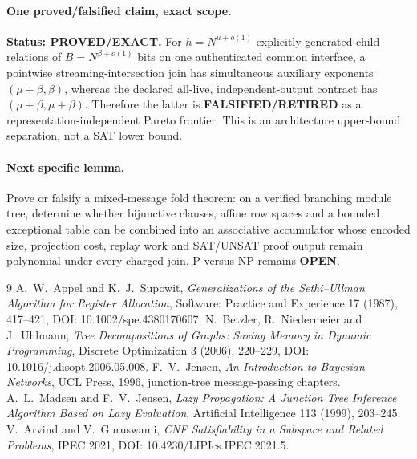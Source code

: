 \documentclass[11pt]{article}
\newcommand{\Status}[1]{\textbf{Status: #1.}}
\begin{document}
\paragraph{One proved/falsified claim, exact scope.}
\Status{PROVED/EXACT} For $h=N^{\mu+o(1)}$ explicitly generated child relations of
$B=N^{\beta+o(1)}$ bits on one authenticated common interface, a pointwise streaming-intersection
join has simultaneous auxiliary exponents $(\mu+\beta,\beta)$, whereas the declared all-live,
independent-output contract has $(\mu+\beta,\mu+\beta)$.  Therefore the latter is
\textbf{FALSIFIED/RETIRED} as a representation-independent Pareto frontier.  This is an architecture
upper-bound separation, not a SAT lower bound.

\paragraph{Next specific lemma.}
Prove or falsify a mixed-message fold theorem: on a verified branching module tree, determine whether
bijunctive clauses, affine row spaces and a bounded exceptional table can be combined into an
associative accumulator whose encoded size, projection cost, replay work and SAT/UNSAT proof output
remain polynomial under every charged join.  P versus NP remains \textbf{OPEN}.

\begin{thebibliography}{9}
 A.~W.~Appel and K.~J.~Supowit, \emph{Generalizations of the Sethi--Ullman Algorithm for
Register Allocation}, Software: Practice and Experience 17 (1987), 417--421,
DOI: 10.1002/spe.4380170607.
 N.~Betzler, R.~Niedermeier and J.~Uhlmann, \emph{Tree Decompositions of Graphs: Saving
Memory in Dynamic Programming}, Discrete Optimization 3 (2006), 220--229,
DOI: 10.1016/j.disopt.2006.05.008.
 F.~V.~Jensen, \emph{An Introduction to Bayesian Networks}, UCL Press, 1996, junction-tree
message-passing chapters.
 A.~L.~Madsen and F.~V.~Jensen, \emph{Lazy Propagation: A Junction Tree Inference
Algorithm Based on Lazy Evaluation}, Artificial Intelligence 113 (1999), 203--245.
 V.~Arvind and V.~Guruswami, \emph{CNF Satisfiability in a Subspace and Related Problems},
IPEC 2021, DOI: 10.4230/LIPIcs.IPEC.2021.5.
\end{thebibliography}

\end{document}

